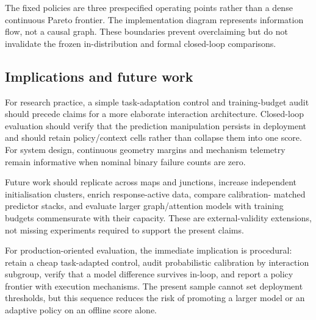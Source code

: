 The fixed policies are three prespecified operating points rather than a dense
continuous Pareto frontier. The implementation diagram represents information
flow, not a causal graph. These boundaries prevent overclaiming but do not
invalidate the frozen in-distribution and formal closed-loop comparisons.

\subsection{Implications and future work}

For research practice, a simple task-adaptation control and training-budget
audit should precede claims for a more elaborate interaction architecture.
Closed-loop evaluation should verify that the prediction manipulation persists
in deployment and should retain policy/context cells rather than collapse them
into one score. For system design, continuous geometry margins and mechanism
telemetry remain informative when nominal binary failure counts are zero.

Future work should replicate across maps and junctions, increase independent
initialisation clusters, enrich response-active data, compare calibration-
matched predictor stacks, and evaluate larger graph/attention models with
training budgets commensurate with their capacity. These are external-validity
extensions, not missing experiments required to support the present claims.

For production-oriented evaluation, the immediate implication is procedural:
retain a cheap task-adapted control, audit probabilistic calibration by
interaction subgroup, verify that a model difference survives in-loop, and
report a policy frontier with execution mechanisms. The present sample cannot
set deployment thresholds, but this sequence reduces the risk of promoting a
larger model or an adaptive policy on an offline score alone.
